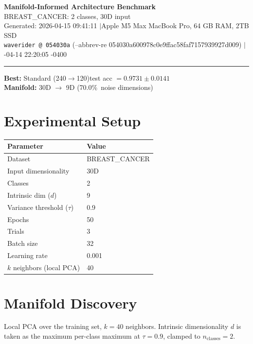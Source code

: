 \documentclass[11pt,letterpaper]{article}
\begin{document}
\begin{center}
  {\LARGE\bfseries\color{wavblue} Manifold-Informed Architecture Benchmark}\\[6pt]
  {\large BREAST\_CANCER: 2 classes, 30D input}\\[8pt]
  {\small Generated: 2026-04-15 09:41:11 \quad$|$\quad Apple M5 Max MacBook Pro, 64 GB RAM, 2TB SSD}\\[2pt]
  {\small\texttt{waverider @ 054030a} (--abbrev-re
054030a600978c0e9ffac58faf7157939927d009) \quad$|$-04-14 22:20:05 -0400}
\end{center}
{\color{wavblue}\noindent\rule{\linewidth}{1.5pt}}
\medskip

\noindent\colorbox{wavlight}{\parbox{\dimexpr\linewidth-2\fboxsep\relax}{
  \smallskip
  \textbf{Best:} Standard (240$\rightarrow$120)\quad test acc $= 0.9731 \pm 0.0141$\\[2pt]
  \textbf{Manifold:} 30D $\rightarrow$ 9D (70.0\%\ noise dimensions)\\[2pt]
  \smallskip
}}
\bigskip

\section{Experimental Setup}

\begin{tabular}{@{}ll@{}}
\toprule
\textbf{Parameter} & \textbf{Value} \\
\midrule
  Dataset & BREAST\_CANCER \\
  Input dimensionality & 30D \\
  Classes & 2 \\
  Intrinsic dim ($d$) & 9 \\
  Variance threshold ($\tau$) & 0.9 \\
  Epochs & 50 \\
  Trials & 3 \\
  Batch size & 32 \\
  Learning rate & 0.001 \\
  $k$ neighbors (local PCA) & 40 \\
\bottomrule
\end{tabular}

\section{Manifold Discovery}

Local PCA over the training set, $k = 40$ neighbors. Intrinsic dimensionality $d$ is taken as the maximum per-class maximum at $\tau = 0.9$, clamped to $n_{\mathrm{classes}} = 2$.
\end{document}
